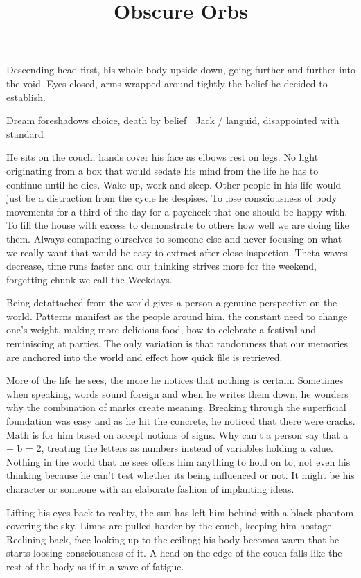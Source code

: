 \title{Obscure Orbs}
\begin{Document}
    Descending head first, his whole body upside down, going further and further into the void. Eyes closed, arms wrapped around tightly
the belief he decided to establish. 
    
    Dream foreshadows choice, death by belief | Jack / languid, disappointed with standard

        He sits on the couch, hands cover his face as elbows rest on legs. No light originating from a box that would sedate his mind from
    the life he has to continue until he dies. Wake up, work and sleep. Other people in his life would just be a distraction from the cycle
    he despises. To lose consciousness of body movements for a third of the day for a paycheck that one should be happy with. To fill the
    house with excess to demonstrate to others how well we are doing like them. Always comparing ourselves to someone else and never focusing
    on what we really want that would be easy to extract after close inspection. Theta waves decrease, time runs faster and our thinking strives
    more for the weekend, forgetting chunk we call the Weekdays.

        Being detattached from the world gives a person a genuine perspective on the world. Patterns manifest as the people around him, the constant
    need to change one's weight, making more delicious food, how to celebrate a festival and reminiscing at parties. The only variation is that
    randomness that our memories are anchored into the world and effect how quick file is retrieved.

        More of the life he sees, the more he notices that nothing is certain. Sometimes when speaking, words sound foreign and when he writes them
    down, he wonders why the combination of marks create meaning. Breaking through the superficial foundation was easy and as he hit the concrete,
    he noticed that there were cracks. Math is for him based on accept notions of signs. Why can't a person say that a + b = 2, treating the letters
    as numbers instead of variables holding a value. Nothing in the world that he sees offers him anything to hold on to, not even his thinking 
    because he can't test whether its being influenced or not. It might be his character or someone with an elaborate fashion of implanting ideas.

        Lifting his eyes back to reality, the sun has left him behind with a black phantom covering the sky. Limbs are pulled harder by the couch,
    keeping him hostage. Reclining back, face looking up to the ceiling; his body becomes warm that he starts loosing consciousness of it. A head
    on the edge of the couch falls like the rest of the body as if in a wave of fatigue.


\end{Document}
